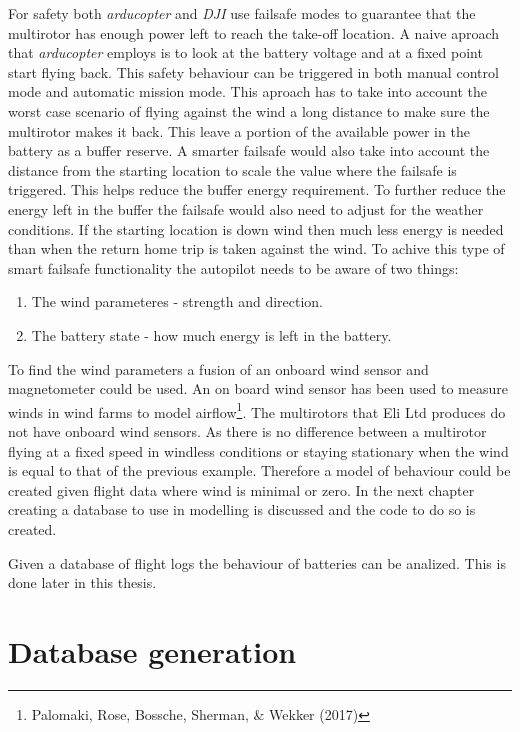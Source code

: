 \documentclass[12pt,oneside]{reedthesis}
\theoremstyle{definition}
\theoremstyle{definition}
\theoremstyle{definition}
\theoremstyle{remark}
\begin{document}
For safety both \emph{arducopter} and \emph{DJI} use failsafe modes to
guarantee that the multirotor has enough power left to reach the
take-off location. A naive aproach that \emph{arducopter} employs is to
look at the battery voltage and at a fixed point start flying back. This
safety behaviour can be triggered in both manual control mode and
automatic mission mode. This aproach has to take into account the worst
case scenario of flying against the wind a long distance to make sure
the multirotor makes it back. This leave a portion of the available
power in the battery as a buffer reserve. A smarter failsafe would also
take into account the distance from the starting location to scale the
value where the failsafe is triggered. This helps reduce the buffer
energy requirement. To further reduce the energy left in the buffer the
failsafe would also need to adjust for the weather conditions. If the
starting location is down wind then much less energy is needed than when
the return home trip is taken against the wind. To achive this type of
smart failsafe functionality the autopilot needs to be aware of two
things:
\begin{enumerate}
\def\labelenumi{\arabic{enumi}.}
\item
  The wind parameteres - strength and direction.
\item
  The battery state - how much energy is left in the battery.
\end{enumerate}
To find the wind parameters a fusion of an onboard wind sensor and
magnetometer could be used. An on board wind sensor has been used to
measure winds in wind farms to model airflow\footnote{Palomaki, Rose,
  Bossche, Sherman, \& Wekker (2017)}. The multirotors that Eli Ltd
produces do not have onboard wind sensors. As there is no difference
between a multirotor flying at a fixed speed in windless conditions or
staying stationary when the wind is equal to that of the previous
example. Therefore a model of behaviour could be created given flight
data where wind is minimal or zero. In the next chapter creating a
database to use in modelling is discussed and the code to do so is
created.

Given a database of flight logs the behaviour of batteries can be
analized. This is done later in this thesis.

\chapter{Database generation}\label{dbs}
\end{document}
